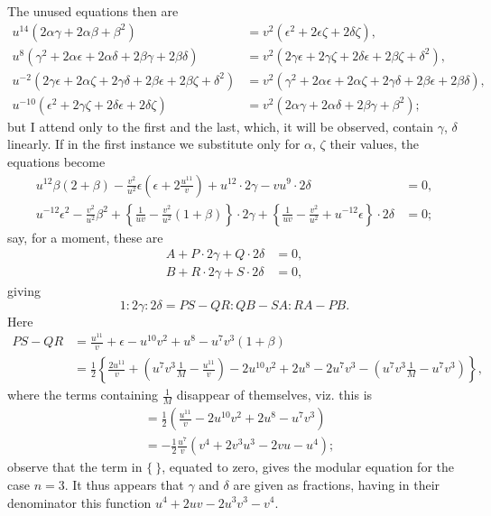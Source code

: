 \documentclass[11pt,a4paper]{book}
\begin{document}
The unused equations then are
\begin{align*}
u^{14}(2\alpha\gamma + 2\alpha\beta + \beta^2) &= v^2(\epsilon^2 + 2\epsilon\zeta + 2\delta\zeta), \\
u^8(\gamma^2 + 2\alpha\epsilon + 2\alpha\delta + 2\beta\gamma + 2\beta\delta)
&= v^2(2\gamma\epsilon + 2\gamma\zeta + 2\delta\epsilon + 2\beta\zeta + \delta^2), \\
u^{-2}(2\gamma\epsilon + 2\alpha\zeta + 2\gamma\delta + 2\beta\epsilon + 2\beta\zeta + \delta^2)
&= v^2(\gamma^2 + 2\alpha\epsilon + 2\alpha\zeta + 2\gamma\delta + 2\beta\epsilon + 2\beta\delta), \\
u^{-10}(\epsilon^2 + 2\gamma\zeta + 2\delta\epsilon + 2\delta\zeta)
&= v^2(2\alpha\gamma + 2\alpha\delta + 2\beta\gamma + \beta^2);
\end{align*}
but I attend only to the first and the last, which, it will be observed, contain $\gamma$, $\delta$ linearly. If in the first instance we substitute only for $\alpha$, $\zeta$ their values, the equations become
\begin{align*}
u^{12}\beta(2 + \beta) - \frac{v^2}{u^2}\epsilon\left(\epsilon + 2\frac{u^{11}}{v}\right) + u^{12} \cdot 2\gamma - vu^9 \cdot 2\delta &= 0, \\
u^{-12}\epsilon^2 - \frac{v^2}{u^2}\beta^2 + \left\{\frac{1}{uv} - \frac{v^2}{u^2}(1 + \beta)\right\} \cdot 2\gamma
+ \left\{\frac{1}{uv} - \frac{v^2}{u^2} + u^{-12}\epsilon\right\} \cdot 2\delta &= 0;
\end{align*}
say, for a moment, these are
\begin{align*}
A + P \cdot 2\gamma + Q \cdot 2\delta &= 0, \\
B + R \cdot 2\gamma + S \cdot 2\delta &= 0,
\end{align*}
giving
\[
1 : 2\gamma : 2\delta = PS - QR : QB - SA : RA - PB.
\]
Here
\begin{align*}
PS - QR &= \frac{u^{11}}{v} + \epsilon - u^{10}v^2 + u^8 - u^7 v^3(1 + \beta) \\
&= \tfrac{1}{2}\left\{\frac{2u^{11}}{v} + \left(u^7 v^3 \frac{1}{M} - \frac{u^{11}}{v}\right)
- 2u^{10}v^2 + 2u^8 - 2u^7 v^3 - \left(u^7 v^3 \frac{1}{M} - u^7 v^3\right)\right\},
\end{align*}
where the terms containing $\frac{1}{M}$ disappear of themselves, viz. this is
\begin{align*}
&= \tfrac{1}{2}\left(\frac{u^{11}}{v} - 2u^{10}v^2 + 2u^8 - u^7 v^3\right) \\
&= -\tfrac{1}{2}\frac{u^7}{v}(v^4 + 2v^3 u^3 - 2vu - u^4);
\end{align*}
observe that the term in $\{~\}$, equated to zero, gives the modular equation for the case $n = 3$. It thus appears that $\gamma$ and $\delta$ are given as fractions, having in their denominator this function $u^4 + 2uv - 2u^3 v^3 - v^4$.
\end{document}
